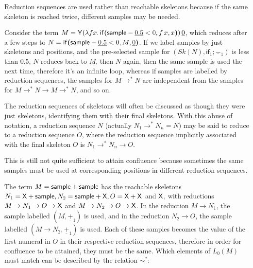 Reduction sequences are used rather than reachable skeletons because if the same skeleton is reached twice, different samples may be needed. 

\begin{example} Consider the term $M = \mathsf{Y} (\lambda f x.\, \mathsf{if}\boldsymbol{(}\mathsf{sample} - \underline{0.5} < 0, f \, x, x\boldsymbol{)}) \, \underline 0$, which reduces after a few steps to $N = \mathsf{if}\boldsymbol{(}\mathsf{sample} - \underline{0.5}  < 0, M, \underline 0\boldsymbol{)}$. If we label samples by just skeletons and positions, and the pre-selected sample for $(\mathit{Sk}(N),\textsf{if}_1;\underline{-}_1)$ is less than 0.5, $N$ reduces back to $M$, then $N$ again, then the same sample is used the next time, therefore it's an infinite loop, whereas if samples are labelled by reduction sequences, the samples for $M \to^\ast N$ are independent from the samples for $M \to^\ast N \to M \to^\ast N$, and so on.
\end{example}

The reduction sequences of skeletons will often be discussed as though they were just skeletons, identifying them with their final skeletons. With this abuse of notation, a reduction sequence $N$ (actually $N_1 \to^\ast N_n = N$) may be said to reduce to a reduction sequence $O$, where the reduction sequence implicitly associated with the final skeleton $O$ is $N_1 \to^\ast N_n \to O$.

\medskip %
This is still not quite sufficient to attain confluence because sometimes the same samples must be used at corresponding positions in different reduction sequences. 

\begin{example} \label{ex:cousin sim} 
The term $M = \mathsf{sample} + \mathsf{sample}$ has the reachable skeletons $N_1 = \mathsf{X} + \mathsf{sample}, N_2 = \mathsf{sample} + \mathsf{X}, O = \mathsf{X} + \mathsf{X}$ and $\mathsf{X}$, with reductions $M \to N_1 \to O \to \mathsf{X}$ and $M \to N_2 \to O \to \mathsf{X}$. 
In the reduction $M \to N_1$, the sample labelled $(M, \underline{+}_1)$ is used, and in the reduction $N_2 \to O$, the sample labelled $(M \to N_2, \underline{+}_1)$ is used. 
Each of these samples becomes the value of the first numeral in $O$ in their respective reduction sequences, therefore in order for confluence to be attained, they must be the same. Which elements of $L_0(M)$ must match can be described by the relation $\sim^*$:
\end{example}

